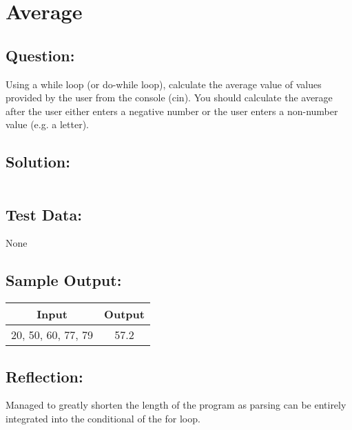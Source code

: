 \documentclass[main.tex]{subfiles}
\begin{document}
    \section{Average}
        \subsection*{Question:}
        Using a while loop (or do-while loop), calculate the average value of values provided by the user from the console (cin).
        You should calculate the average after the user either enters a negative number or the user enters a non-number value (e.g. a letter).
            
        \subsection*{Solution:}
            \inputminted{cpp}{../06-Average/Average.cpp}%

        \subsection*{Test Data:}
            None
        
        \subsection*{Sample Output:}
            \begin{center}
                \begin{tabular}{c c}
                    \hline
                    \textbf{Input} & \textbf{Output} \\
                    \hline
                    20, 50, 60, 77, 79 & 57.2 \\
                \end{tabular}
            \end{center}

        \subsection*{Reflection:}
            Managed to greatly shorten the length of the program as parsing can
            be entirely integrated into the conditional of the for loop.
\end{document}
